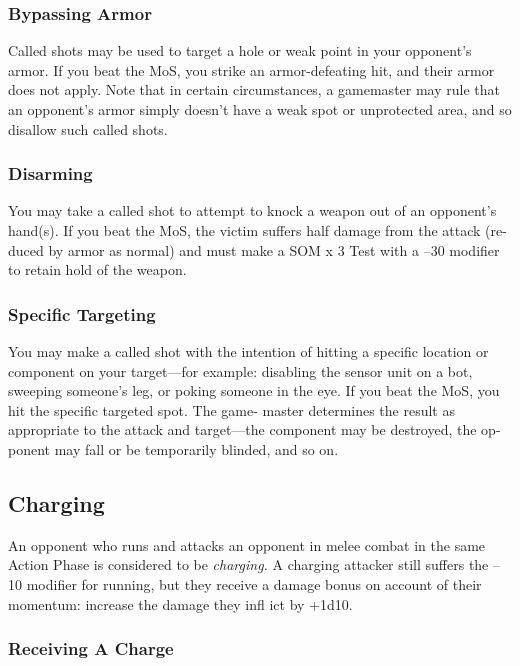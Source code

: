 \subsubsection{Bypassing Armor}

Called shots may be used to target a hole or weak 
point in your opponent's armor. If you beat the MoS, 
you strike an armor-defeating hit, and their armor 
does not apply. Note that in certain circumstances, a 
gamemaster may rule that an opponent's armor simply 
doesn't have a weak spot or unprotected area, and so 
disallow such called shots.

\subsubsection{Disarming}

You may take a called shot to attempt to knock a 
weapon out of an opponent's hand(s). If you beat the 
MoS, the victim suffers half damage from the attack (re-
duced by armor as normal) and must make a SOM x 3 
Test with a –30 modifier to retain hold of the weapon.

\subsubsection{Specific Targeting}

You may make a called shot with the intention of hitting 
a specific location or component on your target—for 
example: disabling the sensor unit on a bot, sweeping 
someone's leg, or poking someone in the eye. If you beat 
the MoS, you hit the specific targeted spot. The game-
master determines the result as appropriate to the attack 
and target—the component may be destroyed, the op-
ponent may fall or be temporarily blinded, and so on.

\subsection{Charging}

An opponent who runs and attacks an opponent in 
melee combat in the same Action Phase is considered 
to be \textit{charging.} A charging attacker still suffers the 
–10 modifier for running, but they receive a damage 
bonus on account of their momentum: increase the 
damage they infl ict by +1d10.

\subsubsection{Receiving A Charge}

